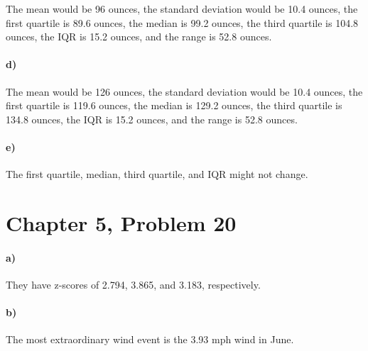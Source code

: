 \documentclass[12pt]{article}
\begin{document}
The mean would be 96 ounces, the standard deviation would be 10.4 ounces, the first quartile is
89.6 ounces, the median is 99.2 ounces, the third quartile is 104.8 ounces, the IQR is 15.2 ounces, and the range is 52.8 ounces.

\paragraph{d)}

The mean would be 126 ounces, the standard deviation would be 10.4 ounces, the first quartile is
119.6 ounces, the median is 129.2 ounces, the third quartile is 134.8 ounces, the IQR is 15.2 ounces, and the range is 52.8 ounces.

\paragraph{e)}

The first quartile, median, third quartile, and IQR might not change.

\section*{Chapter 5, Problem 20}

\paragraph{a)}

They have z-scores of 2.794, 3.865, and 3.183, respectively.

\paragraph{b)}

The most extraordinary wind event is the 3.93 mph wind in June.
\end{document}
